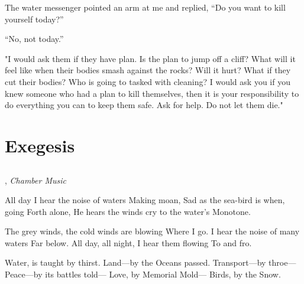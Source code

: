 \documentclass[12pt, letterpaper]{report}
\begin{document}
\vspace{1\baselineskip}
The water messenger pointed an arm at me and replied, ``Do you want to kill yourself today?''

\vspace{1\baselineskip}
``No, not today.''

\vspace{1\baselineskip}
"I would ask them if they have plan. Is the plan to jump off a cliff? What will it feel like when their bodies smash against the rocks? Will it hurt? What if they cut their bodies? Who is going to tasked with cleaning? I would ask you if you knew someone who had a plan to kill themselves, then it is your responsibility to do everything you can to keep them safe. Ask for help. Do not let them die."

\part{Exegesis}

\chapter{}


\author{James Joyce}, \textit{Chamber Music}

\begin{poem}
\begin{stanza}
All day I hear the noise of waters\verseline
Making moan,\verseline
Sad as the sea-bird is when, going\verseline
Forth alone,\verseline
He hears the winds cry to the water’s\verseline
Monotone.
\end{stanza}
\begin{stanza}
The grey winds, the cold winds are blowing\verseline
Where I go.\verseline
I hear the noise of many waters\verseline
Far below.\verseline
All day, all night, I hear them flowing\verseline
To and fro.
\end{stanza}
\end{poem}

\clearpage

\author{Emily Dickinson}

\begin{poem}
\begin{stanza}
Water, is taught by thirst.\verseline
Land---by the Oceans passed.\verseline
Transport---by throe---\verseline
Peace---by its battles told---\verseline
Love, by Memorial Mold---\verseline
Birds, by the Snow.
\end{stanza}
\end{poem}
\end{document}
